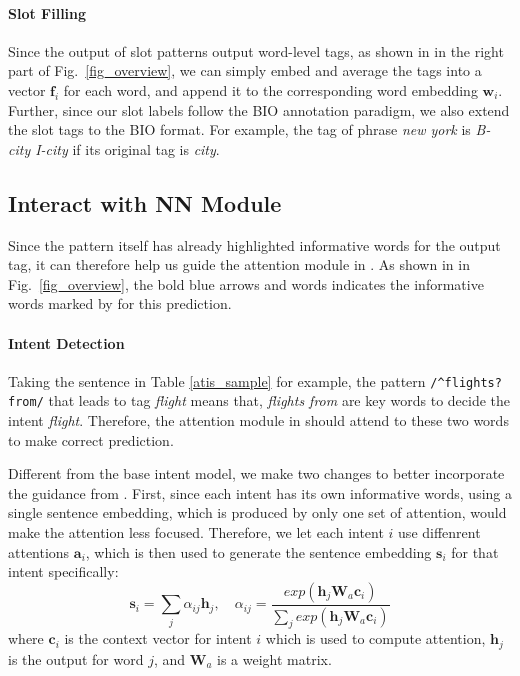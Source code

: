 \paragraph{Slot Filling}
Since the output of slot \RE patterns output word-level tags, as shown in  in the right part of Fig.~\ref{fig_overview}, we can simply embed and average the \RE tags into a vector $\textbf{f}_i$ for each word, and append it to the corresponding word embedding $\textbf{w}_i$. 
Further, since our slot labels follow the BIO annotation paradigm, we also extend the slot \RE tags to the BIO format. For example, the \RE tag of phrase \emph{new york} is \emph{B-city I-city} if its original tag is \emph{city}.

\subsection{Interact with NN Module}
\label{interact_with_module}
Since the \RE pattern itself has already highlighted informative words for the output tag, it can therefore help us guide the attention module in \NN.
As shown in  in Fig.~\ref{fig_overview}, the bold blue arrows and words indicates the informative words marked by \RE for this prediction.
\paragraph{Intent Detection}
Taking the sentence in Table \ref{atis_sample} for example, the pattern \texttt{/\textasciicircum flights?\:from/} that leads to tag \emph{flight} means that, \emph{flights from} are key words to decide the intent \emph{flight}. Therefore, the attention module in \NN should attend to these two words to make correct prediction. 

Different from the base intent model, we make two changes to better incorporate the guidance from \RE.
First, since each intent has its own informative words, using a single sentence embedding, which is produced by only one set of attention, would make the attention less focused. 
Therefore, we let each intent $i$ use diffenrent attentions $\textbf{a}_i$, which is then used to generate the sentence embedding $\textbf{s}_i$ for that intent specifically:
\begin{equation}
\textbf{s}_i = \sum_{j}{\alpha_{ij}\textbf{h}_j}, \quad
\alpha_{ij}=\frac{exp(\textbf{h}_j\textbf{W}_a\textbf{c}_i)}{\sum_{j}{exp(\textbf{h}_j\textbf{W}_a\textbf{c}_i)}}
\label{label_att_eq}
\end{equation}
where $\textbf{c}_i$ is the context vector for intent $i$ which is used to compute attention, $\textbf{h}_j$ is the \BLSTM output for word $j$, and $\textbf{W}_a$ is a weight matrix.

